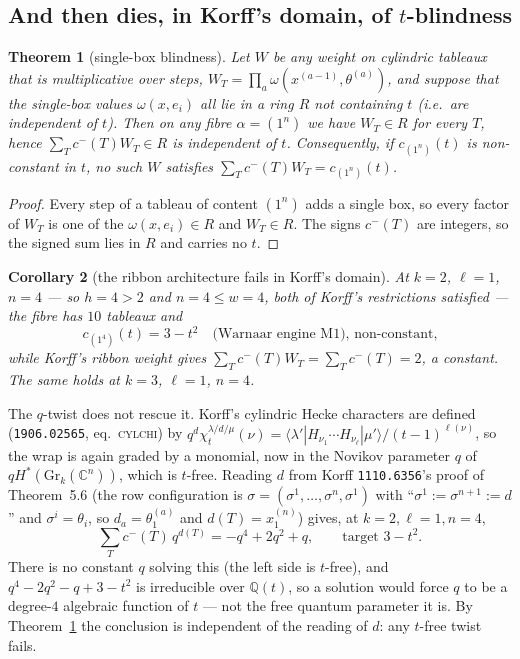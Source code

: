 \documentclass[11pt]{article}
\newtheorem{theorem}{Theorem}
\newtheorem{corollary}[theorem]{Corollary}
\theoremstyle{definition}
\newcommand{\Q}{\mathbb{Q}}
\begin{document}
\subsection{And then dies, in Korff's domain, of $t$-blindness}

\begin{theorem}[single-box blindness]\label{thm:C}
Let $W$ be any weight on cylindric tableaux that is multiplicative over steps,
$W_T=\prod_a \omega(x^{(a-1)},\theta^{(a)})$, and suppose that the single-box values
$\omega(x,e_i)$ all lie in a ring $R$ not containing $t$ (i.e.\ are independent of $t$).
Then on any fibre $\alpha=(1^n)$ we have $W_T\in R$ for every $T$, hence
$\sum_T c^-(T)W_T\in R$ is independent of $t$.  Consequently, if $c_{(1^n)}(t)$ is
non-constant in $t$, no such $W$ satisfies $\sum_T c^-(T)W_T=c_{(1^n)}(t)$.
\end{theorem}
\begin{proof}
Every step of a tableau of content $(1^n)$ adds a single box, so every factor of $W_T$
is one of the $\omega(x,e_i)\in R$ and $W_T\in R$.  The signs $c^-(T)$ are integers, so
the signed sum lies in $R$ and carries no $t$.
\end{proof}

\begin{corollary}[the ribbon architecture fails in Korff's domain]\label{cor:C}
At $k=2$, $\ell=1$, $n=4$ --- so $h=4>2$ and $n=4\le w=4$, both of Korff's restrictions
satisfied --- the fibre has $10$ tableaux and
\[
  c_{(1^4)}(t)=3-t^2 \quad\text{(Warnaar engine M1), non-constant,}
\]
while Korff's ribbon weight gives $\sum_T c^-(T)W_T=\sum_T c^-(T)=2$, a constant.
The same holds at $k=3$, $\ell=1$, $n=4$.
\end{corollary}

\noindent The $q$-twist does not rescue it.  Korff's cylindric Hecke characters are
defined (\texttt{1906.02565}, eq.\ \textsc{cylchi}) by
$q^{d}\chi^{\lambda/d/\mu}_t(\nu)=\langle\lambda'|H_{\nu_1}\cdots H_{\nu_\ell}
|\mu'\rangle/(t-1)^{\ell(\nu)}$, so the wrap is again graded by a monomial, now in the
Novikov parameter $q$ of $qH^*(\mathrm{Gr}_k(\mathbb C^n))$, which is $t$-free.
Reading $d$ from Korff \texttt{1110.6356}'s proof of Theorem~5.6 (the row configuration
is $\sigma=(\sigma^1,\dots,\sigma^n,\sigma^1)$ with ``$\sigma^1:=\sigma^{n+1}:=d$'' and
$\sigma^i=\theta_i$, so $d_a=\theta^{(a)}_1$ and $d(T)=x^{(n)}_1$) gives, at
$k=2,\ell=1,n=4$,
\[
  \sum_T c^-(T)\,q^{d(T)} = -q^4+2q^2+q,\qquad\text{target } 3-t^2 .
\]
There is no constant $q$ solving this (the left side is $t$-free), and
$q^4-2q^2-q+3-t^2$ is irreducible over $\Q(t)$, so a solution would force $q$ to be a
degree-$4$ algebraic function of $t$ --- not the free quantum parameter it is.
By Theorem~\ref{thm:C} the conclusion is independent of the reading of $d$: any $t$-free
twist fails.
\end{document}
